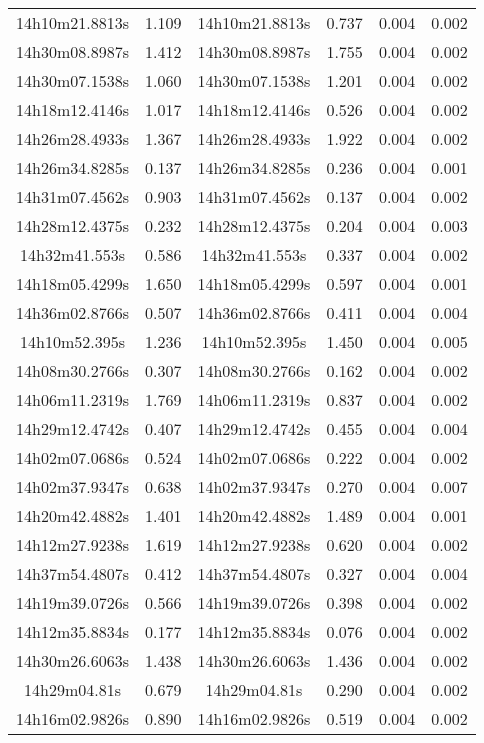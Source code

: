 \begin{table}
\begin{tabular}{cccccc}
14h10m21.8813s & 1.109 & 14h10m21.8813s & 0.737 & 0.004 & 0.002 \\
14h30m08.8987s & 1.412 & 14h30m08.8987s & 1.755 & 0.004 & 0.002 \\
14h30m07.1538s & 1.060 & 14h30m07.1538s & 1.201 & 0.004 & 0.002 \\
14h18m12.4146s & 1.017 & 14h18m12.4146s & 0.526 & 0.004 & 0.002 \\
14h26m28.4933s & 1.367 & 14h26m28.4933s & 1.922 & 0.004 & 0.002 \\
14h26m34.8285s & 0.137 & 14h26m34.8285s & 0.236 & 0.004 & 0.001 \\
14h31m07.4562s & 0.903 & 14h31m07.4562s & 0.137 & 0.004 & 0.002 \\
14h28m12.4375s & 0.232 & 14h28m12.4375s & 0.204 & 0.004 & 0.003 \\
14h32m41.553s & 0.586 & 14h32m41.553s & 0.337 & 0.004 & 0.002 \\
14h18m05.4299s & 1.650 & 14h18m05.4299s & 0.597 & 0.004 & 0.001 \\
14h36m02.8766s & 0.507 & 14h36m02.8766s & 0.411 & 0.004 & 0.004 \\
14h10m52.395s & 1.236 & 14h10m52.395s & 1.450 & 0.004 & 0.005 \\
14h08m30.2766s & 0.307 & 14h08m30.2766s & 0.162 & 0.004 & 0.002 \\
14h06m11.2319s & 1.769 & 14h06m11.2319s & 0.837 & 0.004 & 0.002 \\
14h29m12.4742s & 0.407 & 14h29m12.4742s & 0.455 & 0.004 & 0.004 \\
14h02m07.0686s & 0.524 & 14h02m07.0686s & 0.222 & 0.004 & 0.002 \\
14h02m37.9347s & 0.638 & 14h02m37.9347s & 0.270 & 0.004 & 0.007 \\
14h20m42.4882s & 1.401 & 14h20m42.4882s & 1.489 & 0.004 & 0.001 \\
14h12m27.9238s & 1.619 & 14h12m27.9238s & 0.620 & 0.004 & 0.002 \\
14h37m54.4807s & 0.412 & 14h37m54.4807s & 0.327 & 0.004 & 0.004 \\
14h19m39.0726s & 0.566 & 14h19m39.0726s & 0.398 & 0.004 & 0.002 \\
14h12m35.8834s & 0.177 & 14h12m35.8834s & 0.076 & 0.004 & 0.002 \\
14h30m26.6063s & 1.438 & 14h30m26.6063s & 1.436 & 0.004 & 0.002 \\
14h29m04.81s & 0.679 & 14h29m04.81s & 0.290 & 0.004 & 0.002 \\
14h16m02.9826s & 0.890 & 14h16m02.9826s & 0.519 & 0.004 & 0.002 \\

\end{tabular}
\end{table}
